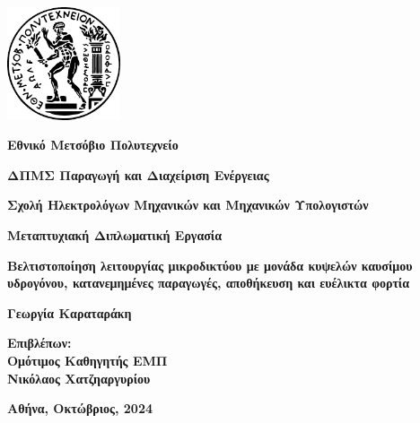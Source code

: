 \begin{titlepage}
    \centering
    
    \includegraphics[width=0.25\textwidth]{figures/emp_logo.png}
    
    \vspace{1cm}
    
    \textbf{\LARGE Εθνικό Μετσόβιο Πολυτεχνείο}

    \vspace{0.05cm}
    
    \textbf{\Large ΔΠΜΣ Παραγωγή και Διαχείριση Ενέργειας}

    \textbf{Σχολή Ηλεκτρολόγων Μηχανικών και Μηχανικών Υπολογιστών}

    \vspace{2cm}

    \textbf{Μεταπτυχιακή Διπλωματική Εργασία}

    \vspace{1cm}

    \textbf{\Large Βελτιστοποίηση λειτουργίας μικροδικτύου με μονάδα
κυψελών καυσίμου υδρογόνου, κατανεμημένες
παραγωγές, αποθήκευση και ευέλικτα φορτία}
    
    \vspace{1cm}
    
    \textbf{\Large Γεωργία Καραταράκη}
    
    \vspace{1.2cm}
    
    \textbf{Επιβλέπων:\\ Ομότιμος Καθηγητής ΕΜΠ \\ Νικόλαος Χατζηαργυρίου}
    
    \vspace{4cm}
    
    \textbf{\large Αθήνα, Οκτώβριος, 2024} %
    
    \vfill
           
\end{titlepage}